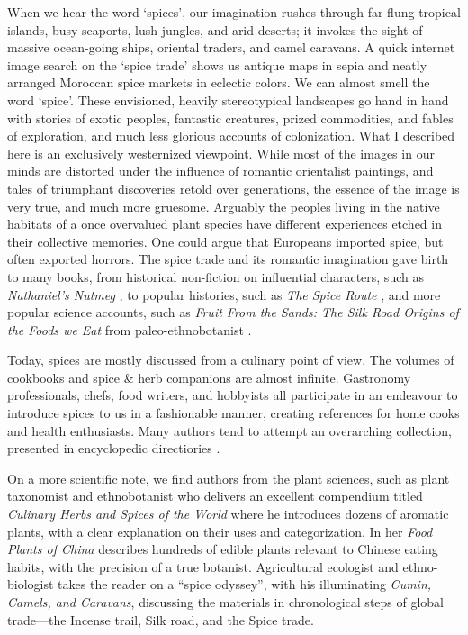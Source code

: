 When we hear the word `spices', our imagination rushes through far-flung tropical islands, busy seaports, lush jungles, and arid deserts; it invokes the sight of massive ocean-going ships, oriental traders, and camel caravans. A quick internet image search on the `spice trade' shows us antique maps in sepia and neatly arranged Moroccan spice markets in eclectic colors. We can almost smell the word `spice'. These envisioned, heavily stereotypical landscapes go hand in hand with stories of exotic peoples, fantastic creatures, prized commodities, and fables of exploration, and much less glorious accounts of colonization. What I described here is an exclusively westernized viewpoint. While most of the images in our minds are distorted under the influence of romantic orientalist paintings, and tales of triumphant discoveries retold over generations, the essence of the image is very true, and much more gruesome. Arguably the peoples living in the native habitats of a once overvalued plant species have different experiences etched in their collective memories. One could argue that Europeans imported spice, but often exported horrors. The spice trade and its romantic imagination gave birth to many books, from historical non-fiction on influential characters, such as \textit{Nathaniel's Nutmeg} \autocite{milton_nathaniels_1999}, to popular histories, such as \textit{The Spice Route} \autocite{keay_spice_2006}, and more popular science accounts, such as \textit{Fruit From the Sands: The Silk Road Origins of the Foods we Eat} from paleo-ethnobotanist \textcite{spengler_fruit_2019}. 

Today, spices are mostly discussed from a culinary point of view. The volumes of cookbooks and spice \& herb companions are almost infinite. Gastronomy professionals, chefs, food writers, and hobbyists all participate in an endeavour to introduce spices to us in a fashionable manner, creating references for home cooks and health enthusiasts. Many authors tend to attempt an overarching collection, presented in encyclopedic directiories \autocite{farrell_spices_1985,craze_spice_1997,herman_herb_2015,norman_herbs_2015,lakshmi_encyclopedia_2016,oconnell_book_2016,opara_culinary_2021}. 

On a more scientific note, we find authors from the plant sciences, such as plant taxonomist and ethnobotanist \textcite{van_wyk_culinary_2014} who delivers an excellent compendium titled \textit{Culinary Herbs and Spices of the World} where he introduces dozens of aromatic plants, with a clear explanation on their uses and categorization. In her \textit{Food Plants of China} \textcite{hu_food_2005} describes hundreds of edible plants relevant to Chinese eating habits, with the precision of a true botanist. Agricultural ecologist and ethno-biologist \textcite{nabhan_cumin_2014} takes the reader on a ``spice odyssey'', with his illuminating \textit{Cumin, Camels, and Caravans}, discussing the materials in chronological steps of global trade---the Incense trail, Silk road, and the Spice trade.

